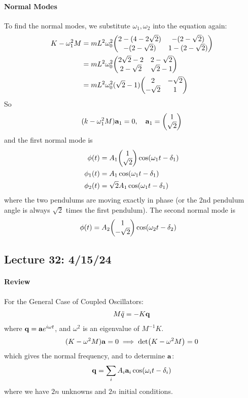 \documentclass[../main.tex]{subfiles}
\begin{document}
\paragraph*{Normal Modes}
To find the normal modes, we substitute $\omega_1, \omega_2$ into the equation again:
\begin{align*}
    K - \omega_1^2 M &= mL^2 \omega_0^2 \mqty(2 - (4 - 2\sqrt 2) & - (2 - \sqrt 2) \\ - (2 - \sqrt 2) & 1 - (2 - \sqrt 2)) \\
    &= m L^2 \omega_0^2 \mqty(2\sqrt 2 - 2 & 2- \sqrt 2 \\ 2- \sqrt 2 & \sqrt 2 - 1) \\
    &= m L^2 \omega_0^2 (\sqrt 2 - 1) \mqty(2 & -\sqrt 2 \\ -\sqrt 2 & 1)
\end{align*}
So 
\begin{align*}
    (k - \omega_1^2 M) \vb a_1 = 0, \quad \vb a_1 = \mqty(1 \\ \sqrt 2)
\end{align*}
and the first normal mode is 
\begin{align*}
    \vb \phi(t) &= A_1 \mqty(1 \\ \sqrt 2) \cos(\omega_1 t - \delta_1) \\
    \phi_1 (t) &= A_1 \cos(\omega_1 t - \delta_1) \\
    \phi_2 (t) &= \sqrt 2 A_1 \cos(\omega_1 t - \delta_1)
\end{align*}
where the two pendulums are moving exactly in phase (or the 2nd pendulum angle is always $\sqrt 2$
times the first pendulum).
The second normal mode is
\begin{align*}
    \vb \phi(t) &= A_2 \mqty(1 \\ -\sqrt 2) \cos(\omega_2 t - \delta_2)
\end{align*}

\newpage
\subsection*{Lecture 32: \hfill 4/15/24}
\paragraph*{Review} 
For the General Case of Coupled Oscillators:
\begin{align*}
    M \ddot q = - K \vb q
\end{align*}
where $\vb q = \vb a e^{i \omega t}$, and $\omega^2$ is an eigenvalue of $M^{-1} K$.
\begin{align*}
    (K - \omega^2 M) \vb a = 0 \implies \det(K - \omega^2 M) = 0
\end{align*}
which gives the normal frequency, and to determine $\vb a$:
\begin{align*}
    \vb q = \sum_i A_i \vb a_i \cos(\omega_i t - \delta_i)
\end{align*}
where we have $2n$ unknowns and $2n$ initial conditions.
\end{document}
